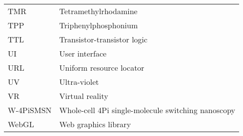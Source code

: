 \begin{flushleft}
\begin{longtable}[l]{|p{5.5em}|p{25em}|}
TMR        & Tetramethylrhodamine                                       \\
TPP        & Triphenylphosphonium                                       \\
TTL        & Transistor-transistor logic                                \\
UI         & User interface                                             \\
URL        & Uniform resource locator                                   \\
UV         & Ultra-violet                                               \\
VR         & Virtual reality                                            \\
W-4PiSMSN  & Whole-cell 4Pi single-molecule switching nanoscopy         \\
WebGL      & Web graphics library     
\\
\hline 
\end{longtable}


\end{flushleft}
